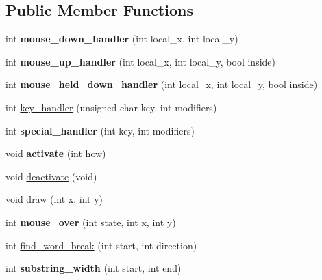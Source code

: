 \subsection*{Public Member Functions}
\begin{DoxyCompactItemize}
\item 
\hypertarget{classGLUI__EditText_a096021e2d0b258ffee0b36988850677b}{int {\bfseries mouse\-\_\-down\-\_\-handler} (int local\-\_\-x, int local\-\_\-y)}\label{classGLUI__EditText_a096021e2d0b258ffee0b36988850677b}

\item 
\hypertarget{classGLUI__EditText_ac05967e2a8826e2bf796c65758da47ea}{int {\bfseries mouse\-\_\-up\-\_\-handler} (int local\-\_\-x, int local\-\_\-y, bool inside)}\label{classGLUI__EditText_ac05967e2a8826e2bf796c65758da47ea}

\item 
\hypertarget{classGLUI__EditText_af98242599d889464f6b8dfb3aa23f6b4}{int {\bfseries mouse\-\_\-held\-\_\-down\-\_\-handler} (int local\-\_\-x, int local\-\_\-y, bool inside)}\label{classGLUI__EditText_af98242599d889464f6b8dfb3aa23f6b4}

\item 
int \hyperlink{classGLUI__EditText_a92fcd78877375cb2bba3b5e9f88635b6}{key\-\_\-handler} (unsigned char key, int modifiers)
\item 
\hypertarget{classGLUI__EditText_a81478f6a0a9ba0c2dc715e0b3730077e}{int {\bfseries special\-\_\-handler} (int key, int modifiers)}\label{classGLUI__EditText_a81478f6a0a9ba0c2dc715e0b3730077e}

\item 
\hypertarget{classGLUI__EditText_a071ddcac9844e7d0bed23a7c0dabadd1}{void {\bfseries activate} (int how)}\label{classGLUI__EditText_a071ddcac9844e7d0bed23a7c0dabadd1}

\item 
void \hyperlink{classGLUI__EditText_a4a83b7bc0b6d60e4fa0dd797b49255ab}{deactivate} (void)
\item 
void \hyperlink{classGLUI__EditText_af5027cba2aeff900776ea1cbea37fdd8}{draw} (int x, int y)
\item 
\hypertarget{classGLUI__EditText_ad21f31b7e27b0f840ee0b8a984341b38}{int {\bfseries mouse\-\_\-over} (int state, int x, int y)}\label{classGLUI__EditText_ad21f31b7e27b0f840ee0b8a984341b38}

\item 
int \hyperlink{classGLUI__EditText_a9ae76bc752e7f6a8ea183c8d52844f6c}{find\-\_\-word\-\_\-break} (int start, int direction)
\item 
\hypertarget{classGLUI__EditText_a66b06ccdabaaee5ee00e77602f1aaa73}{int {\bfseries substring\-\_\-width} (int start, int end)}\label{classGLUI__EditText_a66b06ccdabaaee5ee00e77602f1aaa73}


\end{DoxyCompactItemize}
